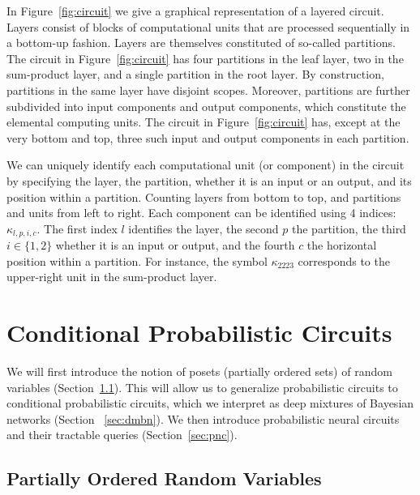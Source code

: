 \documentclass[letterpaper]{article} %
\newcommand{\component}{\ensuremath{{\kappa}}}
\begin{document}
In Figure~\ref{fig:circuit} we give a graphical representation of a layered circuit. Layers consist of  blocks of computational units that are processed sequentially in a bottom-up fashion. Layers are themselves constituted of so-called partitions. The circuit in Figure~\ref{fig:circuit} has four partitions in the leaf layer, two in the sum-product layer, and a single partition in the root layer. By construction, partitions in the same layer have disjoint scopes. Moreover, partitions are further subdivided into input components and output components, which constitute the elemental computing units. The circuit in Figure~\ref{fig:circuit} has, except at the very bottom and top, three such input and output components in each partition.

We can uniquely identify each computational unit (or component) in the circuit by specifying the layer, the partition, whether it is an input or an output, and its position within a partition. Counting layers from bottom to top, and partitions and units from left to right. Each component can be identified using 4 indices: $\component_{l,p,i,c}$. The first index $l$ identifies the layer, the second $p$ the partition, the third $i \in \{1,2 \}$ whether it is an input or output, and the fourth $c$ the horizontal position within a partition.
For instance, the symbol $\component_{2223}$ corresponds to  the upper-right unit in the sum-product layer.



\section{Conditional Probabilistic Circuits}
\label{sec:cpc}

We will first introduce the notion of posets (partially ordered sets) of random variables (Section~\ref{sec:poset}).
This will allow us to generalize probabilistic circuits to conditional probabilistic circuits, which we interpret as deep mixtures of Bayesian networks (Section ~\ref{sec:dmbn}).
We then introduce probabilistic neural circuits and their tractable queries (Section~\ref{sec:pnc}).



\subsection{Partially Ordered Random Variables}
\label{sec:poset}
\end{document}
